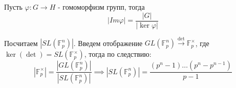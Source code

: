 \begin{cor}
	Пусть $\varphi: G \to H$ - гомоморфизм групп, тогда 
	\[
	|Im\varphi| = \frac{|G|}{|\ker\varphi|}
	\]
\end{cor}

\begin{example}
	Посчитаем $|SL(\mathbb{F}_p^n)|$. Введем отображение $GL(\mathbb{F}_p^n) \overset{\det}{\to} \mathbb{F}_p^{\times}$, где $\ker\left(\det\right) = SL(\mathbb{F}_p^{\times})$, тогда по следствию:
	\[
	|\mathbb{F}_p^{\times}| = \frac{|GL(\mathbb{F}_p^n)|}{|SL(\mathbb{F}_p^n)|} \implies |SL(\mathbb{F}_p^n)| = \frac{(p^n - 1)\dots(p^n - p^{n-1})}{p-1}
	\]
\end{example}

